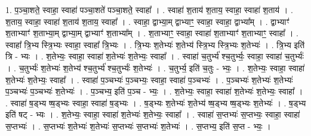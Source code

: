 \documentclass[17pt]{extarticle}
\begin{document}
1. प॒ञ्चा॒शते॒ स्वाहा॒ स्वाहा॑ पञ्चा॒शते॑ पञ्चा॒शते॒ स्वाहा᳚ । . स्वाहा॑ श॒ताय॑ श॒ताय॒ स्वाहा॒ स्वाहा॑ श॒ताय॑ । . श॒ताय॒ स्वाहा॒ स्वाहा॑ श॒ताय॑ श॒ताय॒ स्वाहा᳚ । . स्वाहा॒ द्वाभ्या॒म् द्वाभ्याꣳ॒॒ स्वाहा॒ स्वाहा॒ द्वाभ्या᳚म् । . द्वाभ्याꣳ॑ श॒ताभ्याꣳ॑ श॒ताभ्या॒म् द्वाभ्या॒म् द्वाभ्याꣳ॑ श॒ताभ्या᳚म् । . श॒ताभ्याꣳ॒॒ स्वाहा॒ स्वाहा॑ श॒ताभ्याꣳ॑ श॒ताभ्याꣳ॒॒ स्वाहा᳚ । . स्वाहा᳚ त्रि॒भ्य स्त्रि॒भ्यः स्वाहा॒ स्वाहा᳚ त्रि॒भ्यः । . त्रि॒भ्यः श॒तेभ्यः॑ श॒तेभ्य॑ स्त्रि॒भ्य स्त्रि॒भ्यः श॒तेभ्यः॑ । . त्रि॒भ्य इति॑ त्रि - भ्यः । . श॒तेभ्यः॒ स्वाहा॒ स्वाहा॑ श॒तेभ्यः॑ श॒तेभ्यः॒ स्वाहा᳚ । . स्वाहा॑ च॒तुर्भ्य॑ श्च॒तुर्भ्यः॒ स्वाहा॒ स्वाहा॑ च॒तुर्भ्यः॑ । . च॒तुर्भ्यः॑ श॒तेभ्यः॑ श॒तेभ्य॑ श्च॒तुर्भ्य॑ श्च॒तुर्भ्यः॑ श॒तेभ्यः॑ । . च॒तुर्भ्य॒ इति॑ च॒तुः - भ्यः॒ । . श॒तेभ्यः॒ स्वाहा॒ स्वाहा॑ श॒तेभ्यः॑ श॒तेभ्यः॒ स्वाहा᳚ । . स्वाहा॑ प॒ञ्चभ्यः॑ प॒ञ्चभ्यः॒ स्वाहा॒ स्वाहा॑ प॒ञ्चभ्यः॑ । . प॒ञ्चभ्यः॑ श॒तेभ्यः॑ श॒तेभ्यः॑ प॒ञ्चभ्यः॑ प॒ञ्चभ्यः॑ श॒तेभ्यः॑ । . प॒ञ्चभ्य॒ इति॑ प॒ञ्च - भ्यः॒ । . श॒तेभ्यः॒ स्वाहा॒ स्वाहा॑ श॒तेभ्यः॑ श॒तेभ्यः॒ स्वाहा᳚ । . स्वाहा॑ ष॒ड्भ्य ष्ष॒ड्भ्यः स्वाहा॒ स्वाहा॑ ष॒ड्भ्यः । . ष॒ड्भ्यः श॒तेभ्यः॑ श॒तेभ्य॑ ष्ष॒ड्भ्य ष्ष॒ड्भ्यः श॒तेभ्यः॑ । . ष॒ड्भ्य इति॑ षट् - भ्यः । . श॒तेभ्यः॒ स्वाहा॒ स्वाहा॑ श॒तेभ्यः॑ श॒तेभ्यः॒ स्वाहा᳚ । . स्वाहा॑ स॒प्तभ्यः॑ स॒प्तभ्यः॒ स्वाहा॒ स्वाहा॑ स॒प्तभ्यः॑ । . स॒प्तभ्यः॑ श॒तेभ्यः॑ श॒तेभ्यः॑ स॒प्तभ्यः॑ स॒प्तभ्यः॑ श॒तेभ्यः॑ । . स॒प्तभ्य॒ इति॑ स॒प्त - भ्यः॒ । \newline
\end{document}
